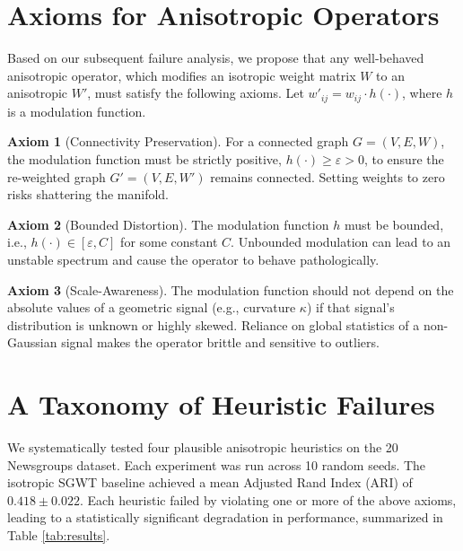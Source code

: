 \documentclass[11pt, letterpaper, twoside]{article}
\theoremstyle{definition}
\newtheorem{axiom}{Axiom}
\begin{document}
\section{Axioms for Anisotropic Operators}
Based on our subsequent failure analysis, we propose that any well-behaved anisotropic operator, which modifies an isotropic weight matrix $W$ to an anisotropic $W'$, must satisfy the following axioms. Let $w'_{ij} = w_{ij} \cdot h(\cdot)$, where $h$ is a modulation function.

\begin{axiom}[Connectivity Preservation]
For a connected graph $G=(V,E,W)$, the modulation function must be strictly positive, $h(\cdot) \ge \varepsilon > 0$, to ensure the re-weighted graph $G'=(V,E,W')$ remains connected. Setting weights to zero risks shattering the manifold.
\end{axiom}

\begin{axiom}[Bounded Distortion]
The modulation function $h$ must be bounded, i.e., $h(\cdot) \in [\varepsilon, C]$ for some constant $C$. Unbounded modulation can lead to an unstable spectrum and cause the operator to behave pathologically.
\end{axiom}

\begin{axiom}[Scale-Awareness]
The modulation function should not depend on the absolute values of a geometric signal (e.g., curvature $\kappa$) if that signal's distribution is unknown or highly skewed. Reliance on global statistics of a non-Gaussian signal makes the operator brittle and sensitive to outliers.
\end{axiom}

\section{A Taxonomy of Heuristic Failures}
We systematically tested four plausible anisotropic heuristics on the 20 Newsgroups dataset. Each experiment was run across 10 random seeds. The isotropic SGWT baseline achieved a mean Adjusted Rand Index (ARI) of $\mathbf{0.418 \pm 0.022}$. Each heuristic failed by violating one or more of the above axioms, leading to a statistically significant degradation in performance, summarized in Table \ref{tab:results}.
\end{document}

